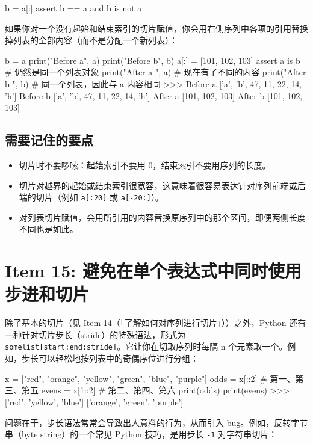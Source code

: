 \begin{codebox}[python]
b = a[:]
assert b == a and b is not a
\end{codebox}

如果你对一个没有起始和结束索引的切片赋值，你会用右侧序列中各项的引用替换掉列表的全部内容（而不是分配一个新列表）：

\begin{codebox}[python]
b = a
print("Before a", a)
print("Before b", b)
a[:] = [101, 102, 103]
assert a is b             # 仍然是同一个列表对象
print("After a ", a)      # 现在有了不同的内容
print("After b ", b)      # 同一个列表，因此与 a 内容相同
>>>
Before a ['a', 'b', 47, 11, 22, 14, 'h']
Before b ['a', 'b', 47, 11, 22, 14, 'h']
After a  [101, 102, 103]
After b  [101, 102, 103]
\end{codebox}

\subsection{需要记住的要点}

\begin{itemize}
\item 切片时不要啰嗦：起始索引不要用 0，结束索引不要用序列的长度。
\item 切片对越界的起始或结束索引很宽容，这意味着很容易表达针对序列前端或后端的切片（例如 \texttt{a[:20]} 或 \texttt{a[-20:]}）。
\item 对列表切片赋值，会用所引用的内容替换原序列中的那个区间，即便两侧长度不同也是如此。
\end{itemize}

\section{Item 15: 避免在单个表达式中同时使用步进和切片}

除了基本的切片（见 Item 14（「了解如何对序列进行切片」））之外，Python 还有一种针对切片步长（stride）的特殊语法，形式为 \texttt{somelist[start:end:stride]}。它让你在切取序列时每隔 n 个元素取一个。例如，步长可以轻松地按列表中的奇偶序位进行分组：

\begin{codebox}[python]
x = ["red", "orange", "yellow", "green", "blue", "purple"]
odds = x[::2]    # 第一、第三、第五
evens = x[1::2]  # 第二、第四、第六
print(odds)
print(evens)
>>>
['red', 'yellow', 'blue']
['orange', 'green', 'purple']
\end{codebox}

问题在于，步长语法常常会导致出人意料的行为，从而引入 bug。例如，反转字节串（byte string）的一个常见 Python 技巧，是用步长 \texttt{-1} 对字符串切片：

